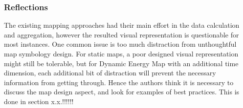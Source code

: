 \documentclass[hidelinks,12pt]{article}
\begin{document}
\subsubsection{Reflections}
The existing mapping approaches had their main effort in the data
calculation and aggregation, however the resulted visual
representation is questionable for most instances. One common issue is
too much distraction from unthoughtful map symbology design. For
static maps, a poor designed visual representation might still be
tolerable, but for Dynamic Energy Map with an additional time
dimension, each additional bit of distraction will prevent the
necessary information from getting through. Hence the authors think it
is necessary to discuss the map design aspect, and look for examples
of best practices. This is done in section x.x.!!!!!!
\begin{comment}

  \item Dynamic Map
    \begin{enumerate}[label*=\arabic*.]
    \item History and Archaeology Instances of Dynamic Maps
      \begin{enumerate}[label*=\arabic*.]
      \item Pittsburgh Historic Map, \url{http://peoplemaps.esri.com/pittsburgh/} 
      \item Europe History Interactive Map, \url{http://www.worldology.com/Europe/europe\_history\_md.htm}
      \end{enumerate}
    \item Animated Maps
      \begin{enumerate}[label*=\arabic*.]
      \item ``The Role of Map Animation for Geographic
        Visualization'', Mark Harrower and Sara Fabrikant
      \item ``Using Computer Animation to Visualize Patterns'', D Dorling and S Openshaw, 1992
      \end{enumerate}
    \item Energy Dynamic Map

      wind farm development dynamic map \cite{DOEWindFarm}
    \end{enumerate}
  \item Works on Visualization focusing on map design and information
    convey


\end{comment}
\end{document}
